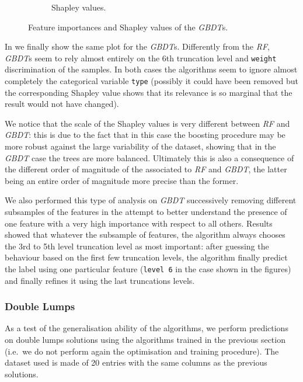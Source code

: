 \begin{figure}[htbp]
\begin{subfigure}{0.45\textwidth}
    \caption{Shapley values.}
  \end{subfigure}
  \caption{Feature importances and Shapley values of the \emph{GBDT}s.}
  \label{fig:lumps:grd_bst}
\end{figure}

In  we finally show the same plot for the \emph{GBDT}s.
Differently from the \emph{RF}, \emph{GBDT}s seem to rely almost entirely on the 6th truncation level and \texttt{weight} discrimination of the samples.
In both cases the algorithms seem to ignore almost completely the categorical variable \texttt{type} (possibly it could have been removed but the corresponding Shapley value shows that its relevance is so marginal that the result would not have changed).

We notice that the scale of the Shapley values is very different between \emph{RF} and \emph{GBDT}: this is due to the fact that in this case the boosting procedure may be more robust against the large variability of the dataset, showing that in the \emph{GBDT} case the trees are more balanced.
Ultimately this is also a consequence of the different order of magnitude of the \mse associated to \emph{RF} and \emph{GBDT}, the latter being an entire order of magnitude more precise than the former.

We also performed this type of analysis on \emph{GBDT} successively removing different subsamples of the features in the attempt to better understand the presence of one feature with a very high importance with respect to all others.
Results showed that whatever the subsample of features, the algorithm always chooses the 3rd to 5th level truncation level as most important: after guessing the behaviour based on the first few truncation levels, the algorithm finally predict the label using one particular feature (\texttt{level 6} in the case shown in the figures) and finally refines it using the last truncations levels.


\subsubsection{Double Lumps}

As a test of the generalisation ability of the algorithms, we perform predictions on double lumps solutions using the algorithms trained in the previous section (i.e.\ we do not perform again the optimisation and training procedure).
The dataset used is made of 20 entries with the same columns as the previous solutions.

